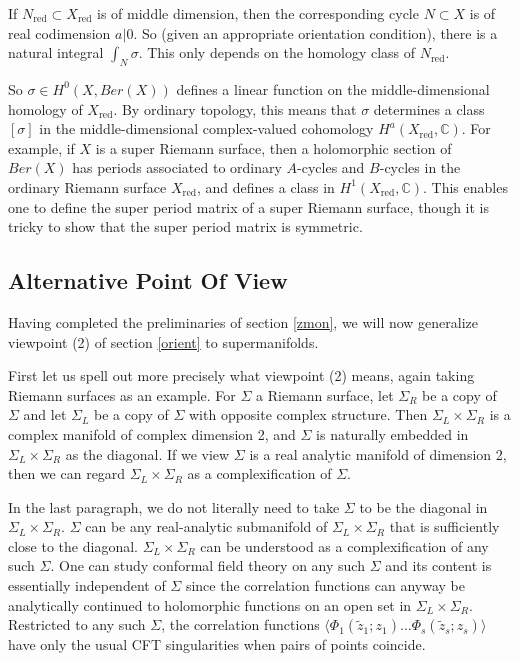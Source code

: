 \documentclass[11pt,a4paper]{article}
\def\t{{ \sf t}}
\def\tilde{\widetilde}
\def\red{{\mathrm{red}}}
\def\C{{\mathbb C}}
\def\t{\tilde }
\def\tilde{\widetilde}
\begin{document}
If $N_\red\subset X_\red$ is of middle dimension, then the corresponding cycle $N\subset X$ is of real codimension $a|0$.  So (given an appropriate
orientation condition), there is a natural integral $\int_N\sigma$.  This only depends on the homology class of $N_\red$.

So  $\sigma\in H^0(X,\mathit{Ber}(X)) $ defines a linear function on the middle-dimensional homology of $X_\red$.  By ordinary topology, this means
that $\sigma$ determines a class $[\sigma]$ in the middle-dimensional complex-valued cohomology $H^a(X_\red,\C)$.  For example, if $X$ is a super Riemann
surface, then a holomorphic section of $\mathit{Ber}(X)$ has periods associated to ordinary $A$-cycles and $B$-cycles in the ordinary
Riemann surface  $X_\red$, and defines a class in $H^1(X_\red,\C)$.  This enables one to define the super period matrix of
a super Riemann surface, though it is tricky to show that the super period matrix is symmetric. 

\subsection{Alternative Point Of View}\label{altpoint}

Having completed the preliminaries of section \ref{zmon},  we will now generalize viewpoint (2) of section \ref{orient} to supermanifolds.  

First let us spell out more precisely what viewpoint (2) means, again taking Riemann surfaces as an example.  For $\Sigma$ a Riemann surface, let $\Sigma_R$ be
a copy of $\Sigma$ and let $\Sigma_L$ be a copy of $\Sigma$ with opposite complex structure.  Then $\Sigma_L\times \Sigma_R$ is a complex
manifold of complex dimension 2, and $\Sigma$ is naturally embedded in $\Sigma_L\times \Sigma_R$ as the diagonal.  If we view
$\Sigma$ is a real analytic manifold of dimension 2, then we can regard $\Sigma_L\times \Sigma_R$ as a complexification
of $\Sigma$.  

In the last paragraph, we do not literally need to take $\Sigma$ to be the diagonal in $\Sigma_L\times \Sigma_R$.  $\Sigma$ can be
any real-analytic submanifold of $\Sigma_L\times \Sigma_R$ that is sufficiently close to the diagonal.  $\Sigma_L\times \Sigma_R$
can be understood as a complexification of any such $\Sigma$.  One can study conformal field theory on any such $\Sigma$ and its
content is essentially independent of $\Sigma$ since the correlation functions can anyway be analytically 
continued to holomorphic functions
on an open
set in $\Sigma_L\times \Sigma_R$.    Restricted to any such $\Sigma$, the correlation functions $ \langle\Phi_1(\t z_1;z_1)\dots \Phi_s(\t z_s;z_s)\rangle$
have only the usual CFT singularities when pairs of points coincide.
\end{document}
